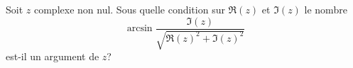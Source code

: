 Soit $z$ complexe non nul. Sous quelle condition sur $\Re(z)$ et $\Im(z)$ le nombre 
\begin{displaymath}
 \arcsin \frac{\Im(z)}{\sqrt{\Re(z)^2+\Im(z)^2}} 
\end{displaymath}
est-il un argument de $z$?
\bigskip
